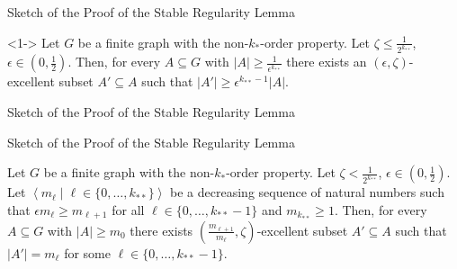 \documentclass{beamer}
\newcommand{\parcurly}[1]{\{ #1 \}}
\newcommand{\parround}[1]{( #1 )}
\newcommand{\Partriangle}[1]{\left< #1 \right>}
\begin{document}
\begin{frame}{Sketch of the Proof of the Stable Regularity Lemma}
    \begin{lemma}<1-> \label{lem:existance_of_excellent_subsets}
        Let $G$ be a finite graph with the non-$k_{*}$-order property.
        Let $\zeta \leq \frac{1}{2^{k_{**}}}$, $\epsilon \in \parround{0, \frac{1}{2}}$.
        Then, for every $A \subseteq G$ with $|A| \geq \frac{1}{\epsilon^{k_{**}}}$ there exists an $(\epsilon, \zeta)$-excellent
        subset $A' \subseteq A$ such that $|A'| \geq \epsilon^{k_{**}-1} |A|$.
    \end{lemma}

\end{frame}

\begin{frame}{Sketch of the Proof of the Stable Regularity Lemma}
    
\end{frame}

\begin{frame}{Sketch of the Proof of the Stable Regularity Lemma}
    \begin{lemma}
        Let $G$ be a finite graph with the non-$k_{*}$-order property.
        Let $\zeta < \frac{1}{2^{k_{**}}}$, $\epsilon \in \parround{0, \frac{1}{2}}$.
        Let $\Partriangle{m_\ell \mid \ell \in \parcurly{0, \dots, k_{**}}}$ be a decreasing sequence of natural numbers such that
        $\epsilon m_{\ell} \geq m_{\ell+1}$ for all $\ell \in \parcurly{0, \dots, k_{**}-1}$ and $m_{k_{**}} \geq 1$.
        Then, for every $A \subseteq G$ with $|A| \geq m_0$ there exists
        $\parround{\frac{m_{\ell+1}}{m_{\ell}}, \zeta}$-excellent subset $A' \subseteq A$ such that $|A'| = m_\ell$ for
        some $\ell \in \parcurly{0, \dots, k_{**}-1}$.
    \end{lemma}
\end{frame}
\end{document}
